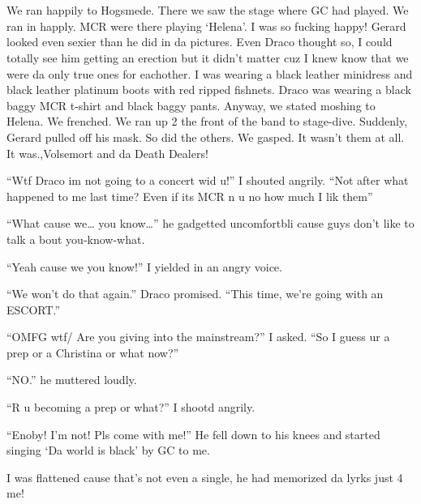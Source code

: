 \section{}



We ran happily to Hogsmede. There we saw the stage where GC had played. We ran in happly. MCR were there playing \enquote*{Helena}. I was so fucking happy! Gerard looked even sexier than he did in da pictures. Even Draco thought so, I could totally see him getting an erection but it didn't matter cuz I knew know that we were da only true ones for eachother. I was wearing a black leather minidress and black leather platinum boots with red ripped fishnets. Draco was wearing a black baggy MCR t-shirt and black baggy pants. Anyway, we stated moshing to Helena. We frenched. We ran up 2 the front of the band to stage-dive. Suddenly, Gerard pulled off his mask. So did the others. We gasped. It wasn't them at all. It was.,\dotfill Volsemort and da Death Dealers!

\enquote{Wtf Draco im not going to a concert wid u!} I shouted angrily. \enquote{Not after what happened to me last time? Even if its MCR n u no how much I lik them}

\begin{sloppypar}
    \enquote{What cause we\ldots{} you know\ldots{}} he gadgetted uncom\-fort\-bli cause guys don't like to talk a bout you-know-what.
\end{sloppypar}

\enquote{Yeah cause we you know!} I yielded in an angry voice.

\enquote{We won't do that again.} Draco promised. \enquote{This time, we're going with an ESCORT\@.}

\enquote{OMFG wtf/ Are you giving into the mainstream?} I asked. \enquote{So I guess ur a prep or a Christina or what now?}

\enquote{NO\@.} he muttered loudly.

\enquote{R u becoming a prep or what?} I shootd angrily.

\enquote{Enoby! I'm not! Pls come with me!} He fell down to his knees and started singing \enquote*{Da world is black} by GC to me.

I was flattened cause that's not even a single, he had memorized da lyrks just 4 me!

